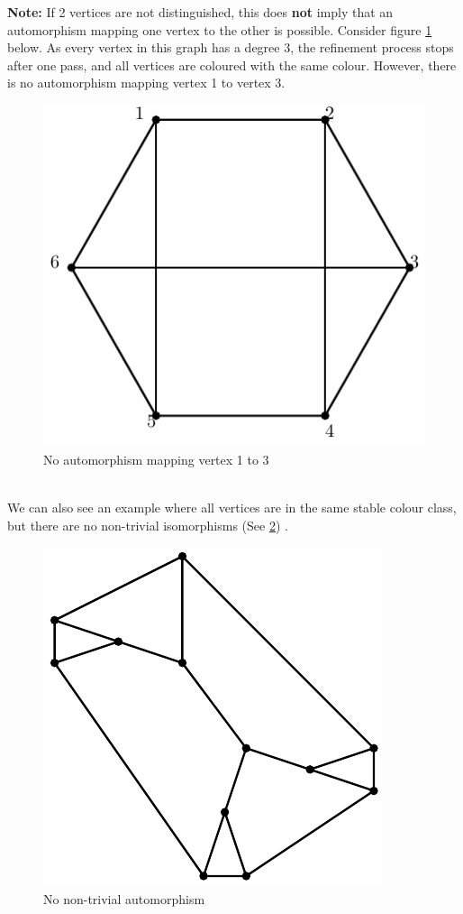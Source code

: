 \textbf{Note: }If 2 vertices are not distinguished, this does \textbf{not} imply that an automorphism mapping one vertex to the other is possible. 
Consider figure \ref{fig:StableColouringNotIsomorphic6} below. As every vertex in this graph has a degree 3, the refinement process stops after one pass, and all vertices are coloured with the same colour.
However, there is no automorphism mapping vertex 1 to vertex 3.
\begin{figure}[htp!]
	\centering
	\includegraphics[scale=1]{images/not_iso.pdf}
	\caption{No automorphism mapping vertex 1 to 3}
	\label{fig:StableColouringNotIsomorphic6}
\end{figure}
\\We can also see an example where all vertices are in the same stable colour class, but there are no non-trivial isomorphisms (See \ref{fig:StableColouringNotIsomorphic12}) .
\begin{figure}[htp!]
	\centering
	\includegraphics[scale=1]{images/not_iso12.pdf}
	\caption{No non-trivial automorphism}
	\label{fig:StableColouringNotIsomorphic12}
\end{figure}



